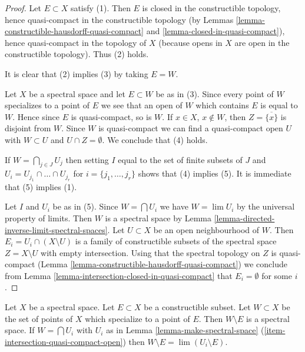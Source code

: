 \begin{proof}
Let $E \subset X$ satisfy (1). Then $E$ is closed in the constructible
topology, hence quasi-compact in the constructible topology (by
Lemmas \ref{lemma-constructible-hausdorff-quasi-compact} and
\ref{lemma-closed-in-quasi-compact}), hence quasi-compact in the topology
of $X$ (because opens in $X$ are open in the constructible topology). Thus
(2) holds.

\medskip\noindent
It is clear that (2) implies (3) by taking $E = W$.

\medskip\noindent
Let $X$ be a spectral space and let $E \subset W$ be as in (3).
Since every point of $W$ specializes to a point of $E$ we see that
an open of $W$ which contains $E$ is equal to $W$. Hence since $E$
is quasi-compact, so is $W$.
If $x \in X$, $x \not \in W$, then $Z = \overline{\{x\}}$ is
disjoint from $W$. Since $W$ is quasi-compact we can find a
quasi-compact open $U$ with $W \subset U$ and $U \cap Z = \emptyset$.
We conclude that (4) holds.

\medskip\noindent
If $W = \bigcap_{j \in J} U_j$ then setting $I$ equal to the set of
finite subsets of $J$ and $U_i = U_{j_1} \cap \ldots \cap U_{j_r}$
for $i = \{j_1, \ldots, j_r\}$ shows that (4) implies (5). It is immediate
that (5) implies (1).

\medskip\noindent
Let $I$ and $U_i$ be as in (5).
Since $W = \bigcap U_i$ we have $W = \lim U_i$ by the universal property
of limits. Then $W$ is a spectral space by
Lemma \ref{lemma-directed-inverse-limit-spectral-spaces}.
Let $U \subset X$ be an open neighbourhood of $W$.
Then $E_i = U_i \cap (X \setminus U)$ is a family of constructible
subsets of the spectral space $Z = X \setminus U$
with empty intersection. Using that the spectral topology on $Z$
is quasi-compact (Lemma \ref{lemma-constructible-hausdorff-quasi-compact})
we conclude from
Lemma \ref{lemma-intersection-closed-in-quasi-compact}
that $E_i = \emptyset$ for some $i$.
\end{proof}

\begin{lemma}
\label{lemma-make-spectral-space-minus}
Let $X$ be a spectral space. Let $E \subset X$ be a constructible subset.
Let $W \subset X$ be the set of points of $X$ which specialize
to a point of $E$. Then $W \setminus E$ is a spectral space.
If $W = \bigcap U_i$ with $U_i$ as in
Lemma \ref{lemma-make-spectral-space}
(\ref{item-intersection-quasi-compact-open})
then $W \setminus E = \lim (U_i \setminus E)$.
\end{lemma}

